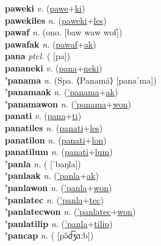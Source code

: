 \textbf{paweki} \textit{v.} (\hyperref[pawe]{pawe}+\hyperref[ki]{ki})
 \label{paweki} \\
\textbf{pawekiles} \textit{n.} (\hyperref[paweki]{paweki}+\hyperref[les]{les})
 \label{pawekiles} \\
\textbf{pawaf} \textit{n.} (ono. [baw waw wof])
 \label{pawaf} \\
\textbf{pawafak} \textit{n.} (\hyperref[pawaf]{pawaf}+\hyperref[ak]{ak})
 \label{pawafak} \\
\textbf{pana} \textit{ptcl.} ( [pa])
 \label{pana} \\
\textbf{pananeki} \textit{v.} (\hyperref[pana]{pana}+\hyperref[neki]{neki})
 \label{pananeki} \\
\textbf{'panama} \textit{n.} (Spa. ⟨Panamá⟩ [panaˈma])
 \label{'panama} \\
\textbf{'panamaak} \textit{n.} (\hyperref['panama]{'panama}+\hyperref[ak]{ak})
 \label{'panamaak} \\
\textbf{'panamawon} \textit{n.} (\hyperref['panama]{'panama}+\hyperref[won]{won})
 \label{'panamawon} \\
\textbf{panati} \textit{v.} (\hyperref[pana]{pana}+\hyperref[ti]{ti})
 \label{panati} \\
\textbf{panatiles} \textit{n.} (\hyperref[panati]{panati}+\hyperref[les]{les})
 \label{panatiles} \\
\textbf{panatilon} \textit{n.} (\hyperref[panati]{panati}+\hyperref[lon]{lon})
 \label{panatilon} \\
\textbf{panatilum} \textit{n.} (\hyperref[panati]{panati}+\hyperref[lum]{lum})
 \label{panatilum} \\
\textbf{'panla} \textit{n.} ( [ˈbaŋla])
 \label{'panla} \\
\textbf{'panlaak} \textit{n.} (\hyperref['panla]{'panla}+\hyperref[ak]{ak})
 \label{'panlaak} \\
\textbf{'panlawon} \textit{n.} (\hyperref['panla]{'panla}+\hyperref[won]{won})
 \label{'panlawon} \\
\textbf{'panlatec} \textit{n.} (\hyperref['panla]{'panla}+\hyperref[tec]{tec})
 \label{'panlatec} \\
\textbf{'panlatecwon} \textit{n.} (\hyperref['panlatec]{'panlatec}+\hyperref[won]{won})
 \label{'panlatecwon} \\
\textbf{'panlatilip} \textit{n.} (\hyperref['panla]{'panla}+\hyperref[tilip]{tilip})
 \label{'panlatilip} \\
\textbf{'pancap} \textit{n.} ( [pə̃d͡ʒɑːb])
